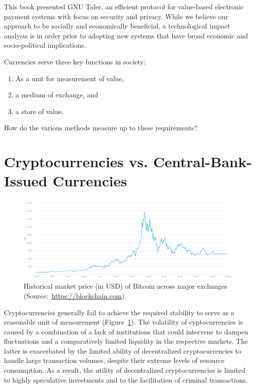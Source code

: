 


This book presented GNU Taler, an efficient protocol for
value-based electronic payment systems with focus on security and
privacy.  While we believe our approach to be socially and economically beneficial, a
technological impact analysis is in order prior to adopting new
systems that have broad economic and socio-political implications.

Currencies serve three key functions in society:~\cite{mankiw2010macroeconomics}
\begin{enumerate}
\item As a unit for measurement of value,
\item a medium of exchange, and
\item a store of value.
\end{enumerate}
How do the various methods measure up to these requirements?

\section{Cryptocurrencies vs. Central-Bank-Issued Currencies}

\begin{figure}
\centering
\includegraphics[width=\textwidth]{diagrams/bitcoin-market-price.png}
  \caption[Historical market price of Bitcoin.]{Historical market price (in
  USD) of Bitcoin across major exchanges (Source:~\url{https://blockchain.com}).}
\label{fig:volatility}
\end{figure}

Cryptocurrencies generally fail to achieve the required stability to serve as a
reasonable unit of measurement (Figure~\ref{fig:volatility}).  The volatility
of cyptocurrencies is caused by a combination of a lack of institutions that
could intervene to dampen fluctuations and a comparatively limited liquidity
in the respective
markets.  The latter is exacerbated by the limited ability of decentralized
cryptocurrencies to handle large transaction volumes, despite their extreme
levels of resource consumption.  As a result, the utility of decentralized
cryptocurrencies is limited to highly speculative investments and to the
facilitation of criminal transactions.

